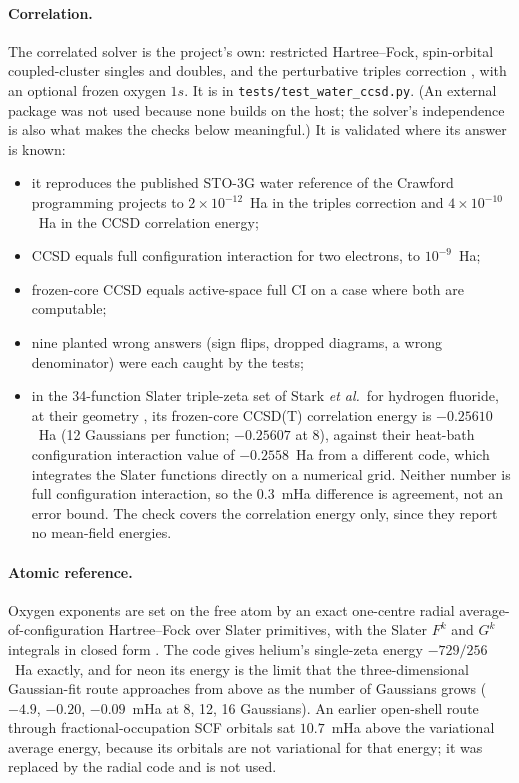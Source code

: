 \documentclass[aps,pra,twocolumn,superscriptaddress,longbibliography]{revtex4-2}
\begin{document}
\paragraph{Correlation.}  The correlated solver is the project's own:
restricted Hartree--Fock, spin-orbital coupled-cluster singles and
doubles, and the perturbative triples correction
\cite{purvis1982,raghavachari1989}, with an optional frozen oxygen $1s$.
It is in \texttt{tests/test\_water\_ccsd.py}.  (An external package was
not used because none builds on the host; the solver's independence is
also what makes the checks below meaningful.)  It is validated where
its answer is known:
\begin{itemize}
\item it reproduces the published STO-3G water reference of the
Crawford programming projects \cite{crawford_projects} to
$2\times10^{-12}$~Ha in the triples correction and
$4\times10^{-10}$~Ha in the CCSD correlation energy;
\item CCSD equals full configuration interaction for two electrons, to
$10^{-9}$~Ha;
\item frozen-core CCSD equals active-space full CI on a case where both
are computable;
\item nine planted wrong answers (sign flips, dropped diagrams, a wrong
denominator) were each caught by the tests;
\item in the 34-function Slater triple-zeta set of Stark \emph{et al.}\
for hydrogen fluoride, at their geometry \cite{stark2025}, its
frozen-core CCSD(T) correlation energy is $-0.25610$~Ha (12 Gaussians
per function; $-0.25607$ at 8), against their heat-bath configuration
interaction value of $-0.2558$~Ha from a different code, which
integrates the Slater functions directly on a numerical grid.  Neither number is full configuration interaction,
so the $0.3$~mHa difference is agreement, not an error bound.  The
check covers the correlation energy only, since they report no
mean-field energies.
\end{itemize}

\paragraph{Atomic reference.}  Oxygen exponents are set on the free
atom by an exact one-centre radial average-of-configuration
Hartree--Fock over Slater primitives, with the Slater $F^{k}$ and
$G^{k}$ integrals in closed form
\cite{slater1960}.  The code gives helium's single-zeta energy
$-729/256$~Ha exactly, and for neon its energy is the limit that the
three-dimensional Gaussian-fit route approaches from above as the
number of Gaussians grows ($-4.9$, $-0.20$, $-0.09$~mHa at 8, 12, 16
Gaussians).  An earlier open-shell route through fractional-occupation
SCF orbitals sat $10.7$~mHa above the variational average energy, because
its orbitals are not variational for that energy; it was replaced by the
radial code and is not used.
\end{document}
